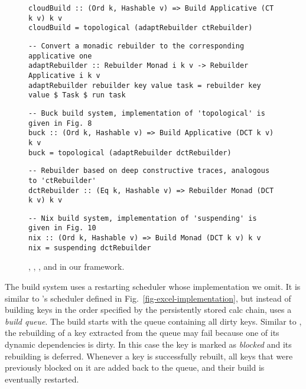 \begin{figure}
\begin{verbatim}
cloudBuild :: (Ord k, Hashable v) => Build Applicative (CT k v) k v
cloudBuild = topological (adaptRebuilder ctRebuilder)
\end{verbatim}
\vspace{0mm}
\begin{verbatim}
-- Convert a monadic rebuilder to the corresponding applicative one
adaptRebuilder :: Rebuilder Monad i k v -> Rebuilder Applicative i k v
adaptRebuilder rebuilder key value task = rebuilder key value $ Task $ run task
\end{verbatim}
\vspace{0mm}
\begin{verbatim}
-- Buck build system, implementation of 'topological' is given in Fig. 8
buck :: (Ord k, Hashable v) => Build Applicative (DCT k v) k v
buck = topological (adaptRebuilder dctRebuilder)
\end{verbatim}
\vspace{0mm}
\begin{verbatim}
-- Rebuilder based on deep constructive traces, analogous to 'ctRebuilder'
dctRebuilder :: (Eq k, Hashable v) => Rebuilder Monad (DCT k v) k v
\end{verbatim}
\vspace{0mm}
\begin{verbatim}
-- Nix build system, implementation of 'suspending' is given in Fig. 10
nix :: (Ord k, Hashable v) => Build Monad (DCT k v) k v
nix = suspending dctRebuilder
\end{verbatim}
\caption{\Bazel, \Cloud \Shake, \CloudBuild, \Buck and \Nix in our framework.}
\label{fig-cloud-implementations}
\end{figure}

The \Bazel build system uses a restarting scheduler whose implementation we
omit. It is similar to \Excel's  scheduler defined in
Fig.~\ref{fig-excel-implementation}, but instead of building keys in the order
specified by the persistently stored calc chain, \Bazel uses a \emph{build
queue}. The build starts with the queue containing all dirty keys. Similar to
\Excel, the rebuilding of a key extracted from the queue may fail because one of
its dynamic dependencies is dirty. In this case the key is marked as
\emph{blocked} and its rebuilding is deferred. Whenever a key is successfully
rebuilt, all keys that were previously blocked on it are added back to the
queue, and their build is eventually restarted.

